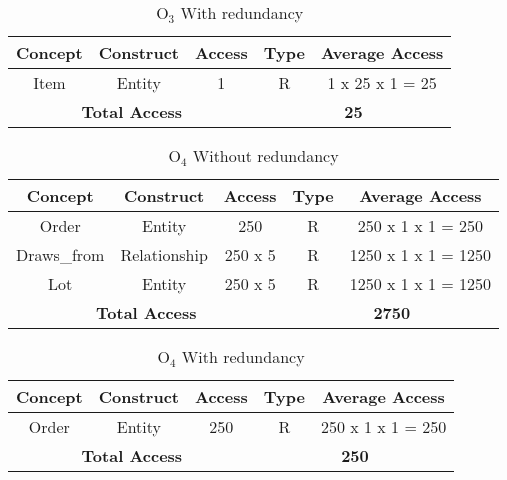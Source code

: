 \begin{table}[!h]\caption{	$ \textrm{O}_\textrm{3} $ With redundancy }
	\begin{center}
		\begin{tabular}{| c | c | c | c | c |}
			\hline
			\textbf{Concept} & \textbf{Construct} & \textbf{Access} & \textbf{Type} & \textbf{Average Access} \\ \hline
			Item & Entity & 1 & R & 1 x 25 x 1 = 25 \\ \hline
			\multicolumn{3}{|c|}{\textbf{Total Access}} & \multicolumn{2}{|c|}{\textbf{25}} \\ \hline
		\end{tabular}
	\end{center}
\end{table}

\begin{table}[!h]\caption{	$ \textrm{O}_\textrm{4} $ Without redundancy }
	\begin{center}
		\begin{tabular}{| c | c | c | c | c |}
			\hline
			\textbf{Concept} & \textbf{Construct} & \textbf{Access} & \textbf{Type} & \textbf{Average Access} \\ \hline
			Order & Entity & 250 & R & 250 x 1 x 1 = 250 \\ \hline
			Draws\_from & Relationship & 250 x 5 & R & 1250 x 1 x 1 = 1250 \\ \hline
			Lot & Entity &  250 x 5 & R & 1250 x 1 x 1 = 1250 \\ \hline
			\multicolumn{3}{|c|}{\textbf{Total Access}} & \multicolumn{2}{|c|}{\textbf{2750}} \\ \hline
		\end{tabular}
	\end{center}
\end{table}
\begin{table}[!h]\caption{	$ \textrm{O}_\textrm{4} $ With redundancy }
	\begin{center}
		\begin{tabular}{| c | c | c | c | c |}
			\hline
			\textbf{Concept} & \textbf{Construct} & \textbf{Access} & \textbf{Type} & \textbf{Average Access} \\ \hline
			Order & Entity & 250 & R & 250 x 1 x 1 = 250 \\ \hline
			\multicolumn{3}{|c|}{\textbf{Total Access}} & \multicolumn{2}{|c|}{\textbf{250}} \\ \hline
		\end{tabular}
	\end{center}
\end{table}
\newpage


